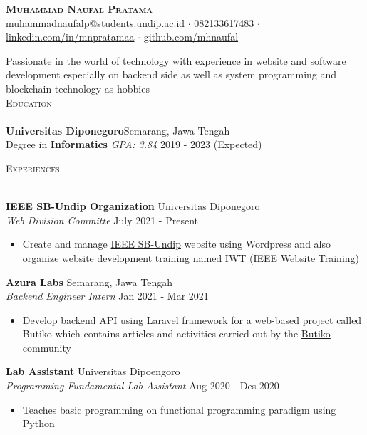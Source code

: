 \documentclass[a4paper]{article}
\newcommand{\lineunder} {
    \vspace*{-8pt} \\
    \hspace*{-18pt} \hrulefill \\
}
\newcommand{\header} [1] {
    {\hspace*{-18pt}\vspace*{6pt} \textsc{#1}}
    \vspace*{-6pt} \lineunder
}
\begin{document}
\vspace*{-40pt}

    

\vspace*{-10pt}
\begin{center}
	{\Huge \scshape \textbf{Muhammad Naufal Pratama}}\\
	\href{mailto:muhammadnaufalp@students.undip.ac.id}{muhammadnaufalp@students.undip.ac.id} $\cdot$ 082133617483 $\cdot$ \href{https://linkedin.com/in/mnpratamaa}{linkedin.com/in/mnpratamaa} $\cdot$ \href{https://github.com/mhnaufal}{github.com/mhnaufal}\\
\end{center}

Passionate in the world of technology with experience in website and software development especially on backend side as well as system programming and blockchain technology as hobbies\\

\header{Education}
\textbf{Universitas Diponegoro}\hfill Semarang, Jawa Tengah\\
Degree in \textbf{Informatics} \textit{GPA: 3.84} \hfill 2019 - 2023 (Expected)\\
\vspace{2mm}

\header{Experiences}
\vspace{1mm}

\textbf{IEEE SB-Undip Organization} \hfill Universitas Diponegoro\\
\textit{Web Division Committe} \hfill July 2021 - Present\\
\vspace{-1mm}
\begin{itemize} \itemsep 1pt
	\item Create and manage \href{https://edu.ieee.org/id-undip/}{IEEE SB-Undip} website using Wordpress and also organize website development training named IWT (IEEE Website Training)
\end{itemize}
\textbf{Azura Labs} \hfill Semarang, Jawa Tengah\\
\textit{Backend Engineer Intern} \hfill Jan 2021 - Mar 2021\\
\vspace{-1mm}
\begin{itemize} \itemsep 1pt
	\item Develop backend API using Laravel framework for a web-based project called \textquotesingle{}Butiko\textquotesingle{} which contains articles and activities carried out by the \textquotesingle{}\href{https://butiko.id/}{Butiko}\textquotesingle{} community
\end{itemize}
\textbf{Lab Assistant} \hfill Universitas Dipoengoro\\
\textit{Programming Fundamental Lab Assistant} \hfill Aug 2020 - Des 2020\\
\vspace{-1mm}
\begin{itemize} \itemsep 1pt
	\item Teaches basic programming on functional programming paradigm using Python
\end{itemize}
\end{document}

